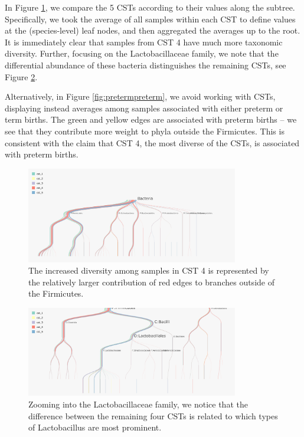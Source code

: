 \documentclass[12pt]{article}
\begin{document}
In Figure \ref{fig:pretermcsts}, we compare the 5 CSTs according to
their values along the subtree. Specifically, we took the average of all
samples within each CST to define values at the (species-level) leaf
nodes, and then aggregated the averages up to the root. It is
immediately clear that samples from CST 4 have much more taxonomic
diversity. Further, focusing on the Lactobacillaceae family, we note
that the differential abundance of these bacteria distinguishes the
remaining CSTs, see Figure \ref{fig:pretermcstslacto}.

Alternatively, in Figure \ref{fig:pretermpreterm}, we avoid working with CSTs,
displaying instead averages among samples associated with either preterm or term
births. The green and yellow edges are associated with preterm births -- we see
that they contribute more weight to phyla outside the Firmicutes. This is
consistent with the claim that CST 4, the most diverse of the CSTs, is
associated with preterm births.

\begin{figure}

{\centering \includegraphics[width=350px]{figure/preterm_csts}

}

\caption{The increased diversity among samples in CST 4 is represented by the relatively larger contribution of red edges to branches outside of the Firmicutes.}\label{fig:pretermcsts}
\end{figure}

\begin{figure}

{\centering \includegraphics[width=350px]{figure/preterm_csts_lacto}

}

\caption{Zooming into the Lactobacillaceae family, we notice that the difference between the remaining four CSTs is related to which types of Lactobacillus are most prominent.}\label{fig:pretermcstslacto}
\end{figure}
\end{document}
